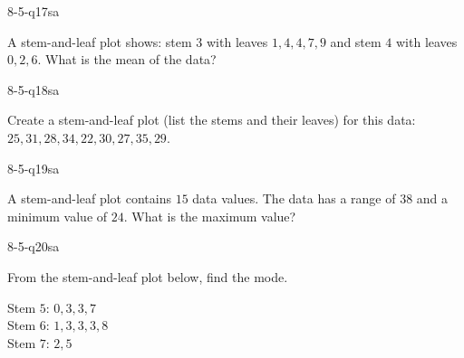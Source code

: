 \begin{practiceQuestion}{8-5-q17}{sa}
\begin{questionText}
A stem-and-leaf plot shows: stem $3$ with leaves $1, 4, 4, 7, 9$ and stem $4$ with leaves $0, 2, 6$. What is the mean of the data?
\end{questionText}
\end{practiceQuestion}

\begin{practiceQuestion}{8-5-q18}{sa}
\begin{questionText}
Create a stem-and-leaf plot (list the stems and their leaves) for this data: $25, 31, 28, 34, 22, 30, 27, 35, 29$.
\end{questionText}
\end{practiceQuestion}

\begin{practiceQuestion}{8-5-q19}{sa}
\begin{questionText}
A stem-and-leaf plot contains $15$ data values. The data has a range of $38$ and a minimum value of $24$. What is the maximum value?
\end{questionText}
\end{practiceQuestion}

\begin{practiceQuestion}{8-5-q20}{sa}
\begin{questionText}
From the stem-and-leaf plot below, find the mode.

Stem $5$: $0, 3, 3, 7$\\
Stem $6$: $1, 3, 3, 3, 8$\\
Stem $7$: $2, 5$
\end{questionText}
\end{practiceQuestion}

